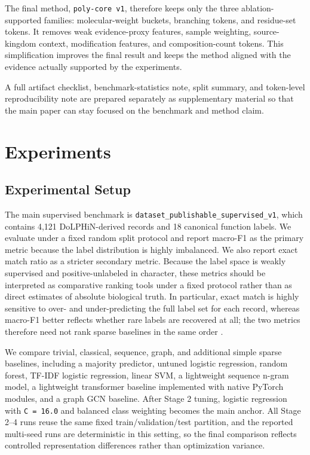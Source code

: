 \documentclass{article}
\begin{document}
The final method, \texttt{poly-core v1}, therefore keeps only the three ablation-supported families: molecular-weight buckets, branching tokens, and residue-set tokens. It removes weak evidence-proxy features, sample weighting, source-kingdom context, modification features, and composition-count tokens. This simplification improves the final result and keeps the method aligned with the evidence actually supported by the experiments.

A full artifact checklist, benchmark-statistics note, split summary, and token-level reproducibility note are prepared separately as supplementary material so that the main paper can stay focused on the benchmark and method claim.

\section{Experiments}
\label{sec:exp}

\subsection{Experimental Setup}

The main supervised benchmark is \texttt{dataset\_publishable\_supervised\_v1}, which contains 4,121 DoLPHiN-derived records and 18 canonical function labels. We evaluate under a fixed random split protocol and report macro-F1 as the primary metric because the label distribution is highly imbalanced. We also report exact match ratio as a stricter secondary metric. Because the label space is weakly supervised and positive-unlabeled in character, these metrics should be interpreted as comparative ranking tools under a fixed protocol rather than as direct estimates of absolute biological truth. In particular, exact match is highly sensitive to over- and under-predicting the full label set for each record, whereas macro-F1 better reflects whether rare labels are recovered at all; the two metrics therefore need not rank sparse baselines in the same order \cite{pillai2017fmeasure}.

We compare trivial, classical, sequence, graph, and additional simple sparse baselines, including a majority predictor, untuned logistic regression, random forest, TF-IDF logistic regression, linear SVM, a lightweight sequence n-gram model, a lightweight transformer baseline implemented with native PyTorch modules, and a graph GCN baseline. After Stage 2 tuning, logistic regression with \texttt{C = 16.0} and balanced class weighting becomes the main anchor. All Stage 2--4 runs reuse the same fixed train/validation/test partition, and the reported multi-seed runs are deterministic in this setting, so the final comparison reflects controlled representation differences rather than optimization variance.
\end{document}
